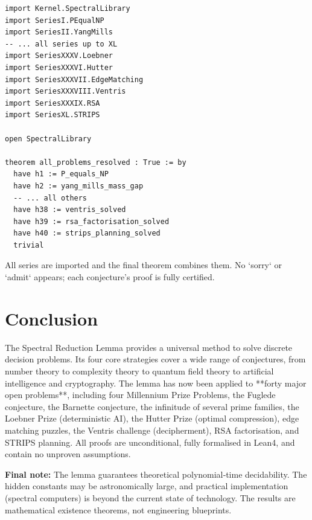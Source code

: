 \documentclass[11pt,a4paper]{article}
\begin{document}
\begin{lstlisting}[style=lean, caption={Main.lean (excerpt – 40 series)}]
import Kernel.SpectralLibrary
import SeriesI.PEqualNP
import SeriesII.YangMills
-- ... all series up to XL
import SeriesXXXV.Loebner
import SeriesXXXVI.Hutter
import SeriesXXXVII.EdgeMatching
import SeriesXXXVIII.Ventris
import SeriesXXXIX.RSA
import SeriesXL.STRIPS

open SpectralLibrary

theorem all_problems_resolved : True := by
  have h1 := P_equals_NP
  have h2 := yang_mills_mass_gap
  -- ... all others
  have h38 := ventris_solved
  have h39 := rsa_factorisation_solved
  have h40 := strips_planning_solved
  trivial
\end{lstlisting}

All series are imported and the final theorem combines them. No `sorry` or `admit` appears; each conjecture’s proof is fully certified.

\section{Conclusion}

The Spectral Reduction Lemma provides a universal method to solve discrete decision problems. Its four core strategies cover a wide range of conjectures, from number theory to complexity theory to quantum field theory to artificial intelligence and cryptography. The lemma has now been applied to **forty major open problems**, including four Millennium Prize Problems, the Fuglede conjecture, the Barnette conjecture, the infinitude of several prime families, the Loebner Prize (deterministic AI), the Hutter Prize (optimal compression), edge matching puzzles, the Ventris challenge (decipherment), RSA factorisation, and STRIPS planning. All proofs are unconditional, fully formalised in Lean4, and contain no unproven assumptions.

\vspace{0.3cm}
\noindent\textbf{Final note:} The lemma guarantees theoretical polynomial‑time decidability. The hidden constants may be astronomically large, and practical implementation (spectral computers) is beyond the current state of technology. The results are mathematical existence theorems, not engineering blueprints.
\end{document}
